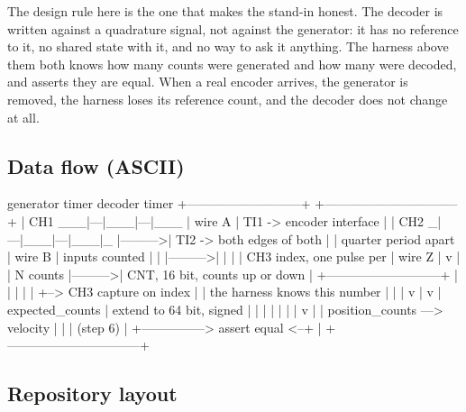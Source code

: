 The design rule here is the one that makes the stand-in honest. The decoder is
written against a quadrature signal, not against the generator: it has no
reference to it, no shared state with it, and no way to ask it anything. The
harness above them both knows how many counts were generated and how many were
decoded, and asserts they are equal. When a real encoder arrives, the generator
is removed, the harness loses its reference count, and the decoder does not
change at all.

\subsection*{Data flow (ASCII)}

\begin{asciiart}
  generator timer                        decoder timer
  +---------------------------+          +--------------------------------+
  | CH1 ___|---|___|---|___    |  wire A  | TI1 -> encoder interface       |
  | CH2 _|---|___|---|___|_    |--------->| TI2 -> both edges of both      |
  |      quarter period apart  |  wire B  |         inputs counted         |
  |                            |--------->|   |                            |
  | CH3 index, one pulse per   |  wire Z  |   v                            |
  |     N counts               |--------->| CNT, 16 bit, counts up or down |
  +---------------------------+          |   |                            |
        |                                 |   +--> CH3 capture on index    |
        | the harness knows this number   |   |                            |
        v                                 |   v                            |
  expected_counts                        | extend to 64 bit, signed        |
        |                                 |   |                            |
        |                                 |   v                            |
        |                                position_counts ---> velocity     |
        |                                 |                     (step 6)   |
        +---------------> assert equal <--+                                |
                                          +--------------------------------+
\end{asciiart}

\subsection*{Repository layout}


